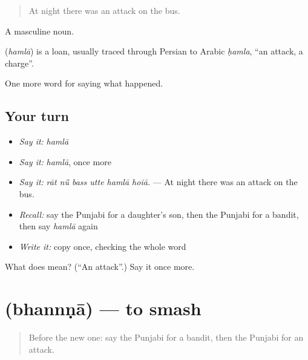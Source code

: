 \begin{quote}
At night there was an attack on the bus.
\end{quote}

A masculine noun.

\begin{cousinweb}
\textbf{} (\emph{hamlā}) is a loan, usually traced through Persian to Arabic \emph{ḥamla}, \textquotedblleft{}an attack, a charge\textquotedblright{}.
\end{cousinweb}

\begin{grammarlens}[title={What you've built}]
One more word for saying what happened.
\end{grammarlens}

\subsection*{Your turn}
\begin{itemize}
\raggedright
  \item \emph{Say it:} \emph{hamlā}
  \item \emph{Say it:} \emph{hamlā}, once more
  \item \emph{Say it:} \emph{rāt nū̃ bass utte hamlā hoiā.} — At night there was an attack on the bus.
  \item \emph{Recall:} say the Punjabi for a daughter's son, then the Punjabi for a bandit, then say \emph{hamlā} again
  \item \emph{Write it:} copy \textbf{} once, checking the whole word
\end{itemize}

\begin{tcolorbox}[breakable,colback=teal!4,colframe=teal!35!black,title={Before you move on}]
What does  mean? (\textquotedblleft{}An attack\textquotedblright{}.) Say it once more.
\end{tcolorbox}
\section[\texorpdfstring{\pa{ਭੰਨਣਾ} (bhannṇā)}{ਭੰਨਣਾ (bhannṇā)}]{ (bhannṇā) — to smash}

\label{lesson:PA-C315-bhannna}



\begin{quote}
Before the new one: say the Punjabi for a bandit, then the Punjabi for an attack.
\end{quote}

